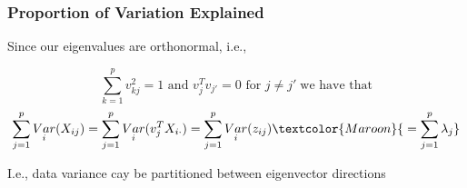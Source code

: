 \documentclass[xcolor={dvipsnames}]{beamer}
\begin{document}
\frame
{
\frametitle{Proportion of Variation Explained}

\color{gray}
Since our eigenvalues are orthonormal, i.e., 
\vspace{-.75em}

$$\sum_{k=1}^p v_{kj}^2 = 1 \text{ and } v_j^Tv_{j'} = 0 \text{ for } j \not = j' \; \text{we have that}$$
\vspace{-.5em}
$$\sum_{j=1}^p \underset{i}{Var}(X_{ij}) = \sum_{j=1}^p \underset{i}{Var}(v_{j}^T X_{i\cdot}) = \sum_{j=1}^p \underset{i}{Var}(z_{ij}) \textcolor{Maroon}{\; = \sum_{j=1}^p \lambda_{j}}$$

\color{black}
I.e., data variance cay be partitioned between eigenvector directions\\




\begin{columns}
\begin{column}{.525\textwidth}


\end{column}
\begin{column}{.5\textwidth}
\vspace{.1in}

\end{column}
\end{columns}


}
\end{document}
